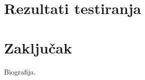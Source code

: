 \documentclass[12pt,oneside]{memoir}
\theoremstyle{proof} \newtheorem{proof}{Dokaz}
\theoremstyle{definition} \newtheorem*{definition}{Definicija}
\begin{document}
\chapter{Rezultati testiranja}

\chapter{Zaključak}

\literatura

\backmatter

\begin{biografija}
	Biografija.
\end{biografija}
\end{document}
